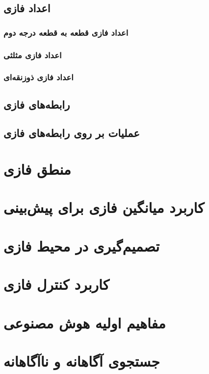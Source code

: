 \documentclass[12pt,a4paper]{article}
\theoremstyle{definition}
\begin{document}
 \subsection{‌اعداد فازی}
  \subsubsection{ ‌اعداد فازی قطعه به قطعه درجه دوم}
  \subsubsection{‌اعداد فازی مثلثی}
  \subsubsection{‌اعداد فازی ذوزنقه‌ای}
 \subsection{رابطه‌های فازی}
 \subsection{عملیات بر روی رابطه‌های فازی}
\section{منطق فازی}
\section{کاربرد میانگین فازی برای پیش‌بینی}
\section{تصمیم‌گیری در محیط فازی}
\section{کاربرد کنترل فازی}
\section{مفاهیم اولیه هوش مصنوعی}
\section{جستجوی آگاهانه و ناآگاهانه}


\end{document}
